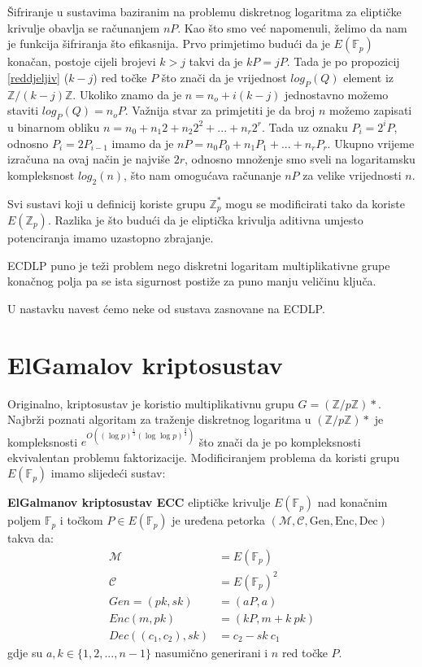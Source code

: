 \documentclass{mathos}
\begin{document}
Šifriranje u sustavima baziranim na problemu diskretnog logaritma za eliptičke krivulje obavlja se računanjem $nP$. Kao što smo već napomenuli, želimo da nam je funkcija šifriranja što efikasnija. Prvo primjetimo budući da je $E(\mathbb{F}_p)$ konačan, postoje cijeli brojevi $k > j$ takvi da je $kP = jP$. Tada je po propozicij \ref{reddjeljiv} ($k - j$) red točke $P$ što znači da je vrijednost $log_P(Q)$ element iz $\mathbb{Z}/(k-j)\mathbb{Z}$. Ukoliko znamo da je $n = n_o + i(k-j)$ jednostavno možemo staviti $log_P(Q) = n_oP$. Važnija stvar za primjetiti je da broj $n$ možemo zapisati u binarnom obliku $n = n_0 + n_1 2 + n_2 2^2 + ... + n_r 2^r$. Tada uz oznaku $P_i = 2^i P$, odnosno $P_i = 2 P_{i-1}$ imamo da je $nP = n_0 P_0 + n_1 P_1 + ... + n_r P_r$. Ukupno vrijeme izračuna na ovaj način je najviše $2r$, odnosno množenje smo sveli na logaritamsku kompleksnost $log_2(n)$, što nam omogućava računanje $nP$ za velike vrijednosti $n$.

Svi sustavi koji u definicij koriste grupu $\mathbb{Z}_p^*$ mogu se modificirati tako da koriste $E(\mathbb{Z}_p)$. Razlika je što budući da je eliptička krivulja aditivna umjesto potenciranja imamo uzastopno zbrajanje.

\begin{nap}
    ECDLP puno je teži problem nego diskretni logaritam multiplikativne grupe konačnog polja pa se ista sigurnost postiže za puno manju veličinu ključa.
\end{nap}

U nastavku navest ćemo neke od sustava zasnovane na ECDLP.

\section{ElGamalov kriptosustav}
Originalno, kriptosustav je koristio multiplikativnu grupu $G = (\mathbb{Z}/p\mathbb{Z})*$. Najbrži poznati algoritam za traženje diskretnog logaritma u $(\mathbb{Z}/p\mathbb{Z})*$ je kompleksnosti $e^{O((\log p)^{\frac{1}{3}} (\log\log p)^{\frac{2}{3}})}$ što znači da je po kompleksnosti ekvivalentan problemu faktorizacije. Modificiranjem problema da koristi grupu $E(\mathbb{F}_p)$ imamo slijedeći sustav:
\begin{defin}
    \textbf{ElGalmanov kriptosustav ECC} eliptičke krivulje $E(\mathbb{F}_p)$ nad konačnim poljem $\mathbb{F}_p$ i točkom $P\in E(\mathbb{F}_p)$ je uređena petorka $(\mathcal{M}, \mathcal{C}, \text{Gen}, \text{Enc}, \text{Dec})$ takva da:
    \begin{align*}
        \mathcal{M} & = E(\mathbb{F}_p) \\
        \mathcal{C} & = E(\mathbb{F}_p)^2 \\
        Gen = (pk, sk) & = (aP, a) \\
        Enc(m, pk) & = (kP, m + k \ pk) \\
        Dec((c_1, c_2), sk) & = c_2 - sk \ c_1
    \end{align*}
    gdje su $a, k \in \{ 1, 2, ..., n-1 \}$ nasumično generirani i $n$ red točke $P$.
\end{defin}
\end{document}

